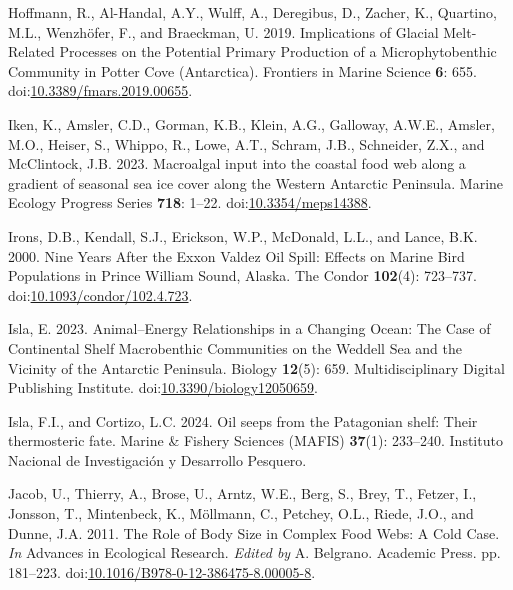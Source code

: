 \documentclass[
]{article}
\newlength{\cslhangindent}
\newenvironment{CSLReferences}[2] %
 {\begin{list}{}{%
  \setlength{\itemindent}{0pt}
  \setlength{\leftmargin}{0pt}
  \setlength{\parsep}{0pt}
  \ifodd #1
   \setlength{\leftmargin}{\cslhangindent}
   \setlength{\itemindent}{-1\cslhangindent}
  \fi
  \setlength{\itemsep}{#2\baselineskip}}}
 {\end{list}}
\begin{document}
\begin{CSLReferences}{1}{0}
Hoffmann, R., Al-Handal, A.Y., Wulff, A., Deregibus, D., Zacher, K.,
Quartino, M.L., Wenzhöfer, F., and Braeckman, U. 2019. Implications of
{Glacial Melt-Related Processes} on the {Potential Primary Production}
of a {Microphytobenthic Community} in {Potter Cove} ({Antarctica}).
Frontiers in Marine Science \textbf{6}: 655.
doi:\href{https://doi.org/10.3389/fmars.2019.00655}{10.3389/fmars.2019.00655}.

Iken, K., Amsler, C.D., Gorman, K.B., Klein, A.G., Galloway, A.W.E.,
Amsler, M.O., Heiser, S., Whippo, R., Lowe, A.T., Schram, J.B.,
Schneider, Z.X., and McClintock, J.B. 2023. Macroalgal input into the
coastal food web along a gradient of seasonal sea ice cover along the
{Western Antarctic Peninsula}. Marine Ecology Progress Series
\textbf{718}: 1--22.
doi:\href{https://doi.org/10.3354/meps14388}{10.3354/meps14388}.

Irons, D.B., Kendall, S.J., Erickson, W.P., McDonald, L.L., and Lance,
B.K. 2000. Nine {Years After} the {Exxon Valdez Oil Spill}: {Effects} on
{Marine Bird Populations} in {Prince William Sound}, {Alaska}. The
Condor \textbf{102}(4): 723--737.
doi:\href{https://doi.org/10.1093/condor/102.4.723}{10.1093/condor/102.4.723}.

Isla, E. 2023. Animal--{Energy Relationships} in a {Changing Ocean}:
{The Case} of {Continental Shelf Macrobenthic Communities} on the
{Weddell Sea} and the {Vicinity} of the {Antarctic Peninsula}. Biology
\textbf{12}(5): 659. Multidisciplinary Digital Publishing Institute.
doi:\href{https://doi.org/10.3390/biology12050659}{10.3390/biology12050659}.

Isla, F.I., and Cortizo, L.C. 2024. Oil seeps from the {Patagonian}
shelf: Their thermosteric fate. Marine \& Fishery Sciences (MAFIS)
\textbf{37}(1): 233--240. Instituto Nacional de Investigaci{ó}n y
Desarrollo Pesquero.

Jacob, U., Thierry, A., Brose, U., Arntz, W.E., Berg, S., Brey, T.,
Fetzer, I., Jonsson, T., Mintenbeck, K., Möllmann, C., Petchey, O.L.,
Riede, J.O., and Dunne, J.A. 2011. The {Role} of {Body Size} in {Complex
Food Webs}: {A Cold Case}. \emph{In} Advances in {Ecological Research}.
\emph{Edited by} A. Belgrano. Academic Press. pp. 181--223.
doi:\href{https://doi.org/10.1016/B978-0-12-386475-8.00005-8}{10.1016/B978-0-12-386475-8.00005-8}.


\end{CSLReferences}
\end{document}

